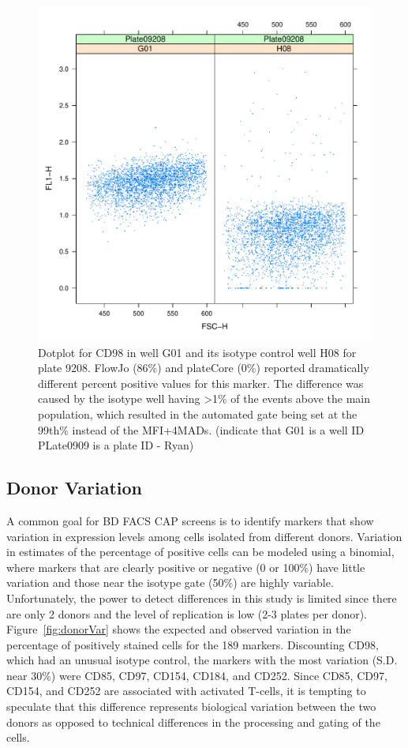 \documentclass[12pt]{article}
\begin{document}
\begin{figure}
\centering
\includegraphics{fjVSr2.pdf}
\caption{Dotplot for CD98 in well G01 and its isotype control well H08 for
plate 9208. FlowJo (86\%) and plateCore (0\%) reported dramatically different
percent positive values for this marker. The  difference was caused by the
isotype well having >1\% of the events above the main population, which
resulted in the automated gate being set at the 99th\% instead of the
MFI+4MADs. (indicate that G01 is a well ID PLate0909 is a plate ID - Ryan)}
\label{fig:disagree}
\end{figure}


\subsection*{Donor Variation}

A common goal for BD FACS CAP screens is to identify markers that show
variation in expression levels among cells isolated from different donors.
Variation in estimates of the percentage of positive cells can be modeled using
a binomial, where markers that are clearly positive or negative (0 or 100\%)
have little variation and those near the isotype gate (50\%) are highly
variable. Unfortunately, the power to detect differences in this study is
limited since there are only 2 donors and the level of replication is low (2-3
plates per donor). Figure~\ref{fig:donorVar} shows  the expected and observed
variation in the percentage of positively stained cells for the 189 markers.
Discounting CD98, which had an unusual isotype control, the markers with the
most variation (S.D. near 30\%) were CD85, CD97, CD154, CD184, and CD252. Since
CD85, CD97, CD154, and CD252 are associated with activated T-cells, it is
tempting to speculate that this difference represents biological variation
between the two donors as opposed to technical differences in the processing
and gating of the cells.
\end{document}
